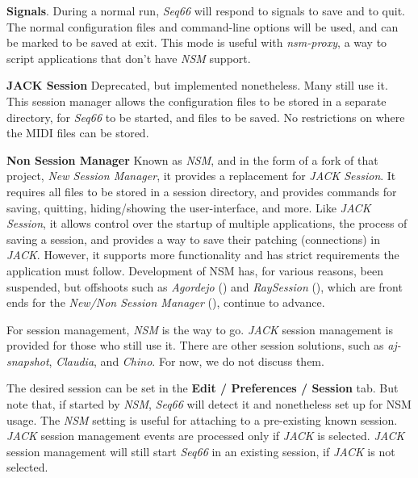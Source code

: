    \begin{enumber}
      \item \textbf{Signals}.
         During a normal run, \textsl{Seq66} will respond
         to signals to save and to quit.
         The normal configuration files and command-line options will be
         used, and can be marked to be saved at exit.
         This mode is useful with \textsl{nsm-proxy}, a way to script
         applications that don't have \textsl{NSM} support.
      \item \textbf{JACK Session}
         Deprecated, but implemented nonetheless.
         Many still use it.
         This session manager allows the configuration files to be stored in
         a separate directory, for \textsl{Seq66} to be started, and files to
         be saved.  No restrictions on where the MIDI files can be stored.
      \item \textbf{Non Session Manager}
         Known as \textsl{NSM}, and in the form of a fork of that project,
         \textsl{New Session Manager},
         it provides a replacement for \textsl{JACK Session}.
         It requires all files to be
         stored in a session directory, and provides commands for saving,
         quitting, hiding/showing the user-interface, and more.
         Like \textsl{JACK Session}, it allows control over the startup of
         multiple applications, the process of saving a session, and provides a
         way to save their patching (connections) in \textsl{JACK}.
         However, it supports more functionality and has
         strict requirements the application must follow.
         Development of NSM has, for various reasons, been suspended, but
         offshoots such as \textsl{Agordejo} (\cite{agordejo})
         and \textsl{RaySession} (\cite{raysession}), which are front ends for
         the \textsl{New/Non Session Manager} (\cite{nsm}),
         continue to advance.
   \end{enumber}

   For session management, \textsl{NSM} is the way to go.
   \textsl{JACK} session management is provided for those who still use it.
   There are other session solutions, such as \textsl{aj-snapshot},
   \textsl{Claudia}, and \textsl{Chino}.
   For now, we do not discuss them.

   The desired session can be set in the \textbf{Edit / Preferences /
   Session} tab.  But note that, if started by \textsl{NSM}, \textsl{Seq66}
   will detect it and nonetheless set up for NSM usage.
   The \textsl{NSM} setting is
   useful for attaching to a pre-existing known session.
   \textsl{JACK} session management events are processed
   only if \textsl{JACK} is selected.
   \textsl{JACK} session management will still start \textsl{Seq66} in
   an existing session, if \textsl{JACK} is
   not selected.

